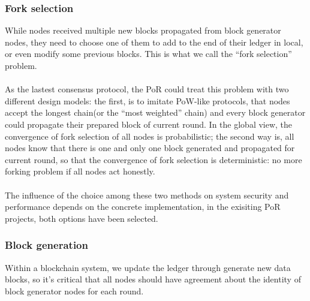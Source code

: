 \documentclass[]{article}
\begin{document}
\begin{CJK*}{UTF8}{gbsn}
\subsubsection*{Fork selection}
While nodes received multiple new blocks propagated from block generator nodes, they need to choose one of them to add to the end of their ledger in local, or even modify some previous blocks. This is what we call the ``fork selection'' problem. 
\paragraph{} As the lastest consensus protocol, the PoR could treat this problem with two different design models: the first, is to imitate PoW-like protocols, that nodes accept the longest chain(or the ``most weighted'' chain) and every block generator could propagate their prepared block of current round. In the global view, the convergence of fork selection of all nodes is probabilistic; the second way is, all nodes know that there is one and only one block generated and propagated for current round, so that the convergence of fork selection is deterministic: no more forking problem if all nodes act honestly.
\paragraph{} The influence of the choice among these two methods on system security and performance depends on the concrete implementation, in the exisiting PoR projects, both options have been selected.
\subsubsection*{Block generation}
Within a blockchain system, we update the ledger through generate new data blocks, so it's critical that all nodes should have agreement about the identity of  block generator nodes for each round.

\end{CJK*}
\end{document}
